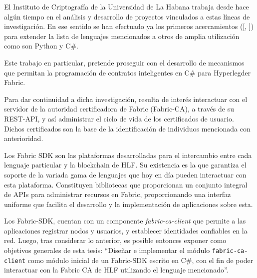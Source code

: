 El Instituto de Criptograf\'ia de la Universidad de La Habana trabaja desde hace alg\'un tiempo en el an\'alisis y desarrollo de proyectos vinculados a estas l\'ineas de investigaci\'on. En ese sentido se han efectuado ya los primeros acercamientos ([\cite{chaincode22python}, \cite{chaincode22csharp}]) para extender la lista de lenguajes mencionados a otros de amplia utilizaci\'on como son Python y C\#.

Este trabajo en particular, pretende proseguir con el desarrollo de mecanismos que permitan la programaci\'on de contratos inteligentes en C\# para Hyperlegder Fabric.

Para dar continuidad a dicha investigaci\'on, resulta de inter\'es interactuar con el servidor de la autoridad certificadora de Fabric (Fabric-CA), a trav\'es de su REST-API, y as\'i administrar el ciclo de vida de los certificados de usuario. Dichos certificados son la base de la identificaci\'on de individuos mencionada con anterioridad. 

Los Fabric SDK son las plataformas desarrolladas para el intercambio entre cada lenguaje particular y la blockchain de HLF. Su existencia es la que garantiza el soporte de la variada gama de lenguajes que hoy en d\'ia pueden interactuar con esta plataforma. Constituyen bibliotecas que proporcionan un conjunto integral de APIs para administrar recursos en Fabric, proporcionando una interfaz uniforme que facilita el desarrollo y la implementación de aplicaciones sobre esta. 


Los Fabric-SDK, cuentan con un componente \emph{fabric-ca-client} que permite a las aplicaciones registrar nodos y usuarios, y establecer identidades confiables en la red. Luego, tras considerar lo anterior, es posible entonces exponer como objetivos
generales de esta tesis: “Diseñar e implementar el m\'odulo \texttt{fabric-ca-client} como m\'odulo inicial de un Fabric-SDK escrito en C\#, con el fin de poder interactuar con la Fabric CA de HLF utilizando el lenguaje mencionado”.


